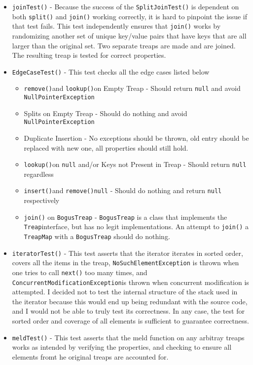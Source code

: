 \documentclass[11pt]{article}
\def\tt{\texttt}
\def\NPE{\tt{NullPointerException}}
\def\TM{\tt{TreapMap}}
\def\CME{\tt{ConcurrentModificationException}}
\def\Treap{\tt{Treap}}
\def\lu{\tt{lookup()}}
\def\ins{\tt{insert()}}
\def\rem{\tt{remove()}}
\def\join{\tt{join()}}
\begin{document}
\begin{itemize}
\begin{itemize}
	\end{itemize}
	\item \tt{joinTest()} - Because the success of the \tt{SplitJoinTest()} is dependent on both \tt{split()} and \tt{join()} working correctly, it is hard to pinpoint the issue if that test fails. This test independently ensures that \join{} works by randomizing another set of unique key/value pairs that have keys that are all larger than the original set. Two separate treaps are made and are joined. The resulting treap is tested for correct properties.
	\item \tt{EdgeCaseTest()} - This test checks all the edge cases listed below
	\begin{itemize}
		\item \rem and \lu on Empty Treap - Should return \tt{null} and avoid \NPE{}
		\item Splits on Empty Treap - Should do nothing and avoid \NPE{}
		\item Duplicate Insertion - No exceptions should be thrown, old entry should be replaced with new one, all properties should still hold.
		\item \lu on \tt{null} and/or Keys not Present in Treap - Should return \tt{null} regardless
		\item \ins and \rem \tt{null} - Should do nothing and return \tt{null} respectively
		\item \join{} on \tt{BogusTreap} - \tt{BogusTreap} is a class that implements the \Treap interface, but has no legit implementations. An attempt to \join{} a \TM{} with a \tt{BogusTreap} should do nothing.
	\end{itemize}
	\item \tt{iteratorTest()} - This test asserts that the iterator iterates in sorted order, covers all the items in the treap,  \tt{NoSuchElementException} is thrown when one tries to call \tt{next()} too many times, and \CME is thrown when concurrent modification is attempted. I decided not to test the internal structure of the stack used in the iterator because this would end up being redundant with the source code, and I would not be able to truly test its correctness. In any case, the test for sorted order and coverage of all elements is sufficient to guarantee correctness.
	\item \tt{meldTest()} - This test asserts that the meld function on any arbitray treaps works as intended by verifying the properties, and checking to ensure all elements fromt he original treaps are accounted for. 
\end{itemize}
\end{document}
